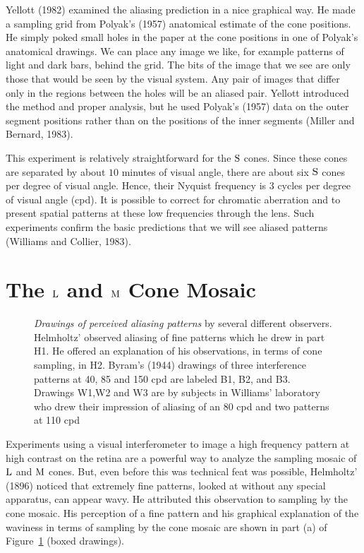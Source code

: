 Yellott (1982) examined the aliasing prediction
in a nice graphical way.
He made a sampling grid from Polyak's (1957)
anatomical estimate of the cone positions.
He simply poked small holes in the paper
at the cone positions in one of Polyak's
anatomical drawings.
We can place any image we like, for example
patterns of light and dark bars, behind the grid.
The bits of the image that we see are only those
that would be seen by the visual system.
Any pair of images that differ only in the regions between
the holes will be an aliased pair.
Yellott introduced the method
and proper analysis,
but he used Polyak's (1957) data on the outer segment
positions rather than on
the positions of the inner segments (Miller and Bernard, 1983).
\nocite{Yellot1982,Polyak1957,MillerBernard1983}

This experiment is relatively straightforward
for the $\mbox{S}$ cones.
Since these cones are separated by about
$10$ minutes of visual angle,
there are about six $\mbox{S}$ cones per degree
of visual angle.
Hence, their Nyquist frequency is
$3$ cycles per degree of visual angle (cpd).
It is possible to correct for chromatic aberration
and to present spatial patterns at these low frequencies through the lens.
Such experiments confirm the basic predictions
that we will see aliased patterns (Williams and Collier, 1983).

\section{The $\mbox{L}$ and $\mbox{M}$ Cone Mosaic}

\begin{figure}
\centerline{
}
\caption[Drawings of Aliases]{
{\em Drawings of perceived aliasing patterns} by several
different observers.
Helmholtz' observed aliasing of fine patterns which
he drew in part H1.
He offered an explanation of his observations,
in terms of cone sampling, in H2.
Byram's (1944) drawings of three interference patterns at
40, 85 and 150 cpd are labeled B1, B2, and B3.
Drawings W1,W2 and W3 are
by subjects in Williams' laboratory 
who drew their impression
of aliasing of an 80 cpd and two patterns at 110 cpd
}
\label{f2:zebra}
\end{figure}
Experiments using a visual interferometer to image a
high frequency pattern at high contrast on the retina are
a powerful way to analyze
the sampling mosaic of $\mbox{L}$ and $\mbox{M}$ cones.
But, even before this was technical feat was possible,
Helmholtz' (1896) noticed that extremely fine patterns,
looked at without any special apparatus, can appear wavy.
He attributed this observation to sampling by the cone mosaic.
His perception of a fine pattern and his graphical
explanation of the waviness in terms of sampling by
the cone mosaic are shown in
part (a) of Figure~\ref{f2:zebra} (boxed drawings).

